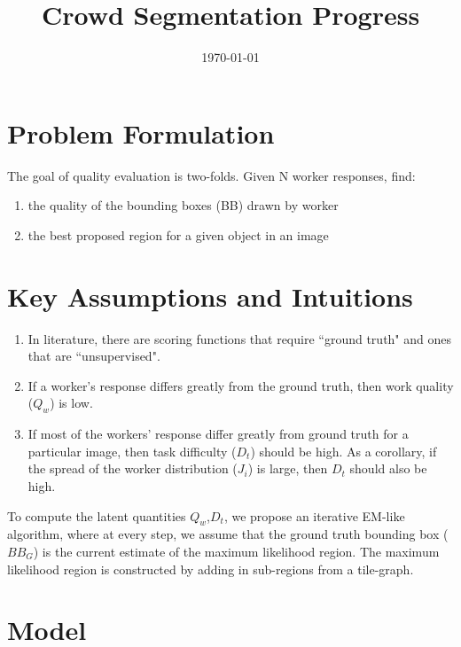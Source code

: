 \documentclass[12pt]{article}
\begin{document}
\title{Crowd Segmentation Progress}
\author{\today}
\date{}
\vspace{-50pt}
\maketitle
\vspace{-70pt}
\section{Problem Formulation}
 The goal of quality evaluation is two-folds. Given N worker responses, find: 
 \begin{enumerate}
\item the quality of the bounding boxes (BB) drawn by worker 
\item the best proposed region for a given object in an image
 \end{enumerate}
\section{Key Assumptions and Intuitions}
\begin{enumerate}
\item In literature, there are scoring functions that require ``ground truth" and ones that are ``unsupervised". 
\item If a worker's response differs greatly from the ground truth, then work quality ($Q_w$) is low. 
\item If most of the workers' response differ greatly from ground truth for a particular image, then task difficulty ($D_t$) should be high. As a corollary, if the spread of the worker distribution ($J_i$) is large, then $D_t$ should also be high.
\end{enumerate}
To compute the latent quantities $Q_w$,$D_t$, we propose an iterative EM-like algorithm, where at every step, we assume that the ground truth bounding box ($BB_G$) is the current estimate of the maximum likelihood region. The maximum likelihood region is constructed by adding in sub-regions from a tile-graph. 
\section{Model}
\end{document}
